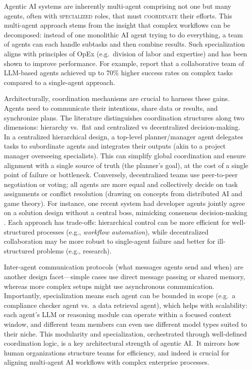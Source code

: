 Agentic AI systems are inherently multi-agent comprising not one but many agents, often with \textsc{specialized} roles, that must \textsc{coordinate} their efforts. This multi-agent approach stems from the insight that complex workflows can be decomposed: instead of one monolithic AI agent trying to do everything, a team of agents can each handle subtasks and then combine results. Such specialization aligns with principles of OpEx (e.g.~division of labor and expertise) and has been shown to improve performance. For example, \textcite{shuEffective2024} report that a collaborative team of LLM-based agents achieved up to 70\% higher success rates on complex tasks compared to a single-agent approach.

Architecturally, coordination mechanisms are crucial to harness these gains. Agents need to communicate their intentions, share data or results, and synchronize plans. The literature distinguishes coordination structures along two dimensions: hierarchy vs.~flat and centralized vs decentralized decision-making. In a centralized hierarchical design, a top-level planner/manager agent delegates tasks to subordinate agents and integrates their outputs (akin to a project manager overseeing specialists). This can simplify global coordination and ensure alignment with a single source of truth (the planner's goal), at the cost of a single point of failure or bottleneck. Conversely, decentralized teams use peer-to-peer negotiation or voting; all agents are more equal and collectively decide on task assignments or conflict resolution (drawing on concepts from distributed AI and game theory). For instance, one recent system had developer agents jointly agree on a solution design without a central boss, mimicking consensus decision-making \parencite{qianChatDev2024}. Each approach has trade-offs: hierarchical control can be more efficient for well-structured processes (e.g., \emph{workflow automation}), while decentralized collaboration may be more robust to single-agent failure and better for ill-structured problems (e.g., research). 

Inter-agent communication protocols (what messages agents send and when) are another design facet—simple cases use direct message passing or shared memory, whereas more complex setups might use asynchronous communication. Importantly, specialization means each agent can be bounded in scope (e.g.~a compliance checker agent vs.~a data retrieval agent), which helps with scalability: each agent's LLM or reasoning module can operate within a focused context window, and different team members can even use different model types suited to their niche. This modularity and specialization, orchestrated through well-defined coordination logic, is a key architectural strength of agentic AI.~It mirrors how human organizations structure teams for efficiency, and indeed is crucial for aligning multi-agent AI workflows with complex enterprise processes. %


